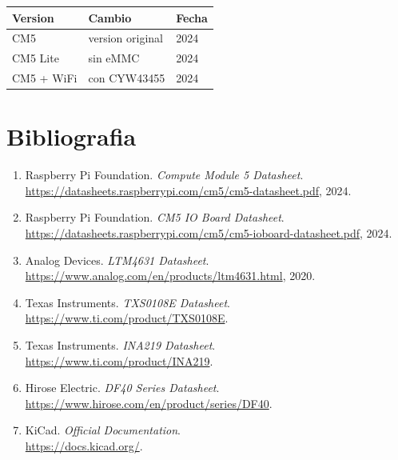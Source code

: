 \documentclass[11pt,a4paper,oneside,openright]{book}
\begin{document}
\begin{center}
\begin{tabular}{lll}
\toprule
\textbf{Version} & \textbf{Cambio} & \textbf{Fecha} \\
\midrule
CM5             & version original   & 2024 \\
CM5 Lite        & sin eMMC           & 2024 \\
CM5 + WiFi      & con CYW43455       & 2024 \\
\bottomrule
\end{tabular}
\end{center}

\backmatter

\chapter*{Bibliografia}

\begin{enumerate}[leftmargin=2em]
\item Raspberry Pi Foundation. \emph{Compute Module 5 Datasheet}. \\
  \url{https://datasheets.raspberrypi.com/cm5/cm5-datasheet.pdf}, 2024.
\item Raspberry Pi Foundation. \emph{CM5 IO Board Datasheet}. \\
  \url{https://datasheets.raspberrypi.com/cm5/cm5-ioboard-datasheet.pdf}, 2024.
\item Analog Devices. \emph{LTM4631 Datasheet}. \\
  \url{https://www.analog.com/en/products/ltm4631.html}, 2020.
\item Texas Instruments. \emph{TXS0108E Datasheet}. \\
  \url{https://www.ti.com/product/TXS0108E}.
\item Texas Instruments. \emph{INA219 Datasheet}. \\
  \url{https://www.ti.com/product/INA219}.
\item Hirose Electric. \emph{DF40 Series Datasheet}. \\
  \url{https://www.hirose.com/en/product/series/DF40}.
\item KiCad. \emph{Official Documentation}. \\
  \url{https://docs.kicad.org/}.
\end{enumerate}
\end{document}
